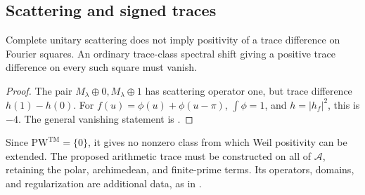 \subsection{Scattering and signed traces}
\label{v4-arith:w9-r4:placement:atp}
\begin{proposition}
\label{v4-arith:w9-r4:prop:spectral-flow-eq-atp}
Complete unitary scattering does not imply positivity of a trace
difference on Fourier squares. An ordinary trace-class spectral
shift giving a positive trace difference on every such square
must vanish.
\end{proposition}
\begin{proof}
The pair \(M_\lambda\oplus0,M_\lambda\oplus1\) has scattering
operator one, but trace difference \(h(1)-h(0)\).
For \(f(u)=\phi(u)+\phi(u-\pi)\), \(\int\phi=1\), and
\(h=|h_f|^2\), this is \(-4\).
The general vanishing statement is
.
\end{proof}
\begin{remark}
\label{v4-arith:w9-r4:rem:scattering-transfers}
Since \(\mathrm{PW}^{\mathrm{TM}}=\{0\}\), it gives no nonzero
class from which Weil positivity can be extended.
The proposed arithmetic trace must be constructed on all of
\(\mathscr A\), retaining the polar, archimedean, and finite-prime
terms. Its operators, domains, and regularization are additional
data, as in .
\end{remark}

